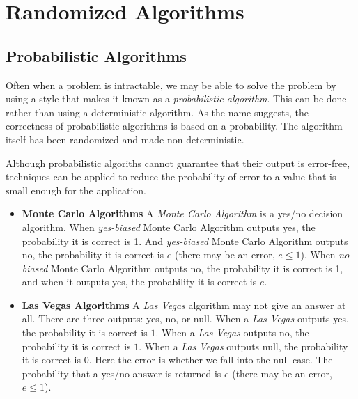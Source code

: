 
\chapter{Randomized Algorithms}


\section{Probabilistic Algorithms}

Often when a problem is intractable, we may 
be able to solve the problem by using a style that makes it
known as a \textit{probabilistic algorithm}. This can be done rather than 
using a deterministic algorithm. As the name suggests, the correctness of 
probabilistic algorithms is based on a probability. 
The algorithm itself has been randomized and made non-deterministic. 

Although probabilistic algoriths cannot guarantee that their 
output is error-free, techniques can be applied to reduce the probability of error 
to a value that is small enough for the application.


\begin{figure}[h]
\end{figure}


\begin{itemize}   
\renewcommand{\labelitemi}{$\Box$}
\item \textbf{Monte Carlo Algorithms}
A \textit{Monte Carlo Algorithm} is a yes/no decision algorithm.
When \textit{yes-biased} Monte Carlo Algorithm outputs yes, 
the probability it is correct is 1. And \textit{yes-biased} 
Monte Carlo Algorithm outputs no, the probability it is correct is $e$ 
(there may be an error, $e \leqslant 1$). 
When \textit{no-biased} Monte Carlo Algorithm outputs no, 
the probability it is correct is 1, and when it outputs 
yes, the probability it is correct is $e$. 

\item \textbf{Las Vegas Algorithms}
A \textit{Las Vegas} algorithm may not give an answer at all. 
There are three outputs: yes, no, or null. 
When a \textit{Las Vegas} outputs yes, the probability it is correct is $1$.
When a \textit{Las Vegas} outputs no, the probability it is correct is $1$.
When a \textit{Las Vegas} outputs null, the probability it is correct is $0$.
Here the error is whether we fall into the null case. The probability that a 
yes/no answer is returned is $e$ (there may be an error, $e \leqslant 1$). 
\end{itemize}


